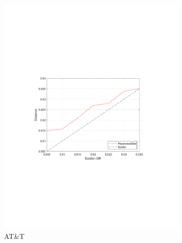 \begin{figure}[ht!]
	\begin{subfigure}{.33\textwidth}
		\includegraphics[width=\linewidth, trim=3.8cm 8cm 4cm 8cm, clip=true]{figures/ep_att}
		\captionsetup{justification=centering}
		\caption{ AT\&T}
		\label{fig:att_dist}
	\end{subfigure}
	\begin{subfigure}{.33\textwidth}

\end{subfigure}
\end{figure}
